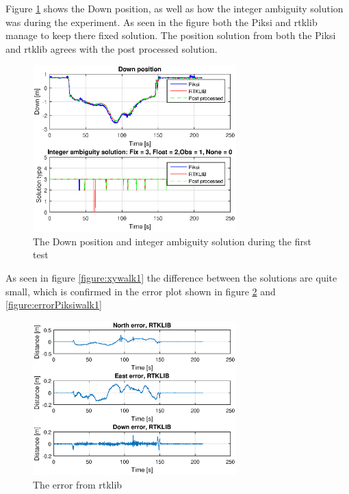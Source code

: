 Figure \ref{figure:DownAndAmbwalk1} shows the Down position, as well as how the integer ambiguity solution was during the experiment. As seen in the figure both the Piksi and \gls{rtklib} manage to keep there fixed solution. The position solution from both the Piksi and \gls{rtklib} agrees with the post processed solution. 
\begin{figure}[H]
	\centering
		\includegraphics[width=0.7\textwidth]{figs/plots/downWalk1.eps}
		\caption{The Down position and integer ambiguity solution during the first test}
		\label{figure:DownAndAmbwalk1}
\end{figure}
As seen in figure \ref{figure:xywalk1} the difference between the solutions are quite small, which is confirmed in the error plot shown in figure \ref{figure:errorRTKwalk1} and \ref{figure:errorPiksiwalk1}
\begin{figure}[H]
	\centering
		\includegraphics[width=0.7\textwidth]{figs/plots/errorRtklibWalk1.eps}
		\caption{The error from \gls{rtklib}}
		\label{figure:errorRTKwalk1}
\end{figure}
